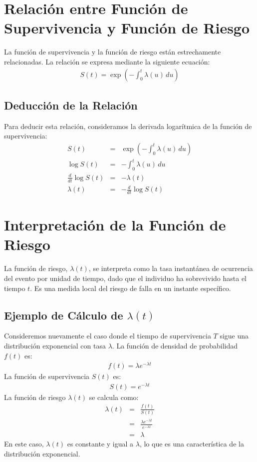 \section{Relaci\'on entre Funci\'on de Supervivencia y Funci\'on de Riesgo}
La funci\'on de supervivencia y la funci\'on de riesgo est\'an estrechamente relacionadas. La relaci\'on se expresa mediante la siguiente ecuaci\'on:
\begin{eqnarray*}
S(t) = \exp\left(-\int_0^t \lambda(u) \, du\right)
\end{eqnarray*}

\subsection{Deducci\'on de la Relaci\'on}
Para deducir esta relaci\'on, consideramos la derivada logar\'itmica de la funci\'on de supervivencia:
\begin{eqnarray*}
S(t) &=& \exp\left(-\int_0^t \lambda(u) \, du\right) \\
\log S(t) &=& -\int_0^t \lambda(u) \, du \\
\frac{d}{dt} \log S(t) &=& -\lambda(t) \\
\lambda(t) &=& -\frac{d}{dt} \log S(t)
\end{eqnarray*}

\section{Interpretaci\'on de la Funci\'on de Riesgo}
La funci\'on de riesgo, $\lambda(t)$, se interpreta como la tasa instant\'anea de ocurrencia del evento por unidad de tiempo, dado que el individuo ha sobrevivido hasta el tiempo $t$. Es una medida local del riesgo de falla en un instante espec\'ifico.

\subsection{Ejemplo de C\'alculo de $\lambda(t)$}
Consideremos nuevamente el caso donde el tiempo de supervivencia $T$ sigue una distribuci\'on exponencial con tasa $\lambda$. La funci\'on de densidad de probabilidad $f(t)$ es:
\begin{eqnarray*}
f(t) = \lambda e^{-\lambda t}
\end{eqnarray*}
La funci\'on de supervivencia $S(t)$ es:
\begin{eqnarray*}
S(t) = e^{-\lambda t}
\end{eqnarray*}
La funci\'on de riesgo $\lambda(t)$ se calcula como:
\begin{eqnarray*}
\lambda(t) &=& \frac{f(t)}{S(t)} \\
           &=& \frac{\lambda e^{-\lambda t}}{e^{-\lambda t}} \\
           &=& \lambda
\end{eqnarray*}
En este caso, $\lambda(t)$ es constante y igual a $\lambda$, lo que es una caracter\'istica de la distribuci\'on exponencial.

